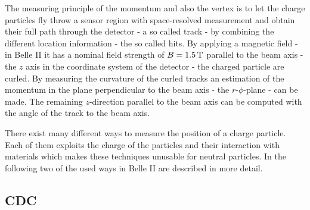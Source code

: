 The measuring principle of the momentum and also the vertex is to let the charge particles fly throw a sensor region with space-resolved measurement and obtain their full path through the detector - a so called track - by combining the different location information - the so called hits. By applying a magnetic field - in Belle II it has a nominal field strength of $B = \unit[1.5]{T}$ parallel to the beam axis - the $z$ axis in the coordinate system of the detector - the charged particle are curled. By measuring the curvature of the curled tracks an estimation of the momentum in the plane perpendicular to the beam axis - the $r$-$\phi$-plane - can be made. The remaining $z$-direction parallel to the beam axis can be computed with the angle of the track to the beam axis.

There exist many different ways to measure the position of a charge particle. Each of them exploits the charge of the particles and their interaction with materials which makes these techniques unusable for neutral particles. In the following two of the used ways in Belle II are described in more detail.

\subsection{CDC}

